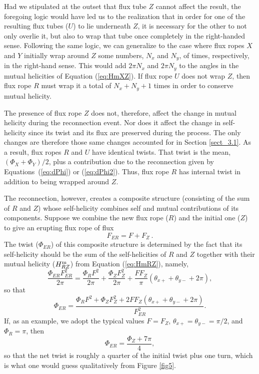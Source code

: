 \documentclass[10pt,namedreferneces]{SolarPhysics}
\begin{document}
\begin{article}
Had we stipulated at the outset that flux tube $Z$ cannot affect the result, the foregoing logic would have led us to the realization that in order for one of the resulting flux tubes ($U$) to lie underneath $Z$, it is necessary for the other to not only overlie it, but also to wrap that tube once completely in the right-handed sense.  Following the same logic, we can generalize to the case where flux ropes $X$ and $Y$ initially wrap around $Z$ some numbers, $N_x$ and $N_y$, of times, respectively, in the right-hand sense.  This would add $2\pi N_x$ and $2\pi N_y$ to the angles in the mutual helicities of Equation  (\ref{eq:HmXZ}).  If flux rope $U$ does not wrap $Z$, then flux rope $R$ must wrap it a total of $N_x+N_y+1$ times in order to conserve mutual helicity.

The presence of flux rope $Z$ does not, therefore, affect the change in mutual helicity during the reconnection event.  Nor does it affect the change in self-helicity since its twist and its flux are preserved during the process.  The only changes are therefore those same changes accounted for in Section \ref{sect_3.1}.  As a result, flux ropes $R$ and $U$ have identical twists.  That twist is the mean, $(\Phi_X+\Phi_Y)/2$, plus a contribution due to the reconnection given by Equations\ (\ref{eq:dPhi}) or (\ref{eq:dPhi2}).  Thus, flux rope $R$ has internal twist in addition to being wrapped around $Z$.

The reconnection, however,  creates a composite structure (consisting of the sum of $R$ and $Z$) whose self-helicity combines self and mutual contributions of its components.  
Suppose we combine the new flux rope ($R$) and the initial one ($Z$) to give an erupting flux rope of flux 
\begin{equation}
F_{ER}=F+F_Z~.
\end{equation}
The twist ($\Phi_{ER}$) of this composite structure is determined by the fact that its self-helicity should be the sum of the self-helicities of $R$ and $Z$ together with their mutual helicity ($H^{\rm m}_{RZ}$) from Equation  (\ref{eq:HmRZ}), namely,
\begin{equation}
\frac{\Phi_{ER}F_{ER}^2}{2\pi}=\frac{\Phi_{R}F^2}{2\pi}+\frac{\Phi_{Z}F_{Z}^2}{2\pi}+\frac{FF_Z}{\pi}(\theta_{x+} + \theta_{y-}+2\pi),
\end{equation}
so that 
\begin{equation}
\Phi_{ER}=\frac{\Phi_{R}F^2+\Phi_{Z}F_{Z}^2+2FF_Z(\theta_{x+} + \theta_{y-}+2\pi)}{F^2_{ER}}.
\label{eq:PhiER}
\end{equation}
If, as an example, we adopt the typical values $F=F_Z$, $\theta_{x+} = \theta_{y-}=\pi/2$, and $\Phi_R=\pi$, then
\begin{equation}
\Phi_{ER}=\frac{\Phi_{Z}+7\pi}{4},
\end{equation}
so that the net twist is roughly a quarter of the initial twist plus one turn, which is what one would guess qualitatively from Figure \ref{fig5}.


\end{article}
\end{document}
